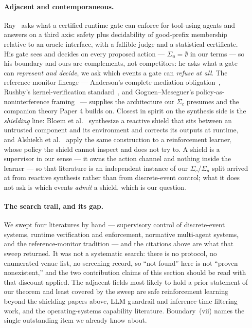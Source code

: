 \documentclass[11pt,a4paper]{article}  \usepackage{mdframed} \usepackage{graphicx} \usepackage{tabularx}
\begin{document}
\paragraph{Adjacent and contemporaneous.} Ray~\cite{ray26} asks what a certified runtime gate can enforce for tool-using
agents and answers on a third axis: safety plus decidability of good-prefix membership relative to an oracle interface, with
a fallible judge and a statistical certificate. His gate sees and decides on every proposed action --- $\Sigma_u=\emptyset$
in our terms --- so his boundary and ours are complements, not competitors: he asks what a gate can \emph{represent and
decide}, we ask which events a gate can \emph{refuse at all}. The reference-monitor lineage --- Anderson's complete-mediation
obligation~\cite{anderson}, Rushby's kernel-verification standard~\cite{rushby}, and Goguen--Meseguer's
policy-as-noninterference framing~\cite{gm82} --- supplies the architecture our $\Sigma_c$ presumes and the companion theory
Paper 4 builds on. Closest in spirit on the synthesis side is the \emph{shielding} line: Bloem et al.~\cite{bkkw15}
synthesize a reactive shield that sits between an untrusted component and its environment and corrects its outputs at
runtime, and Alshiekh et al.~\cite{alshiekh18} apply the same construction to a reinforcement learner, whose policy the
shield cannot inspect and does not try to. A shield is a supervisor in our sense --- it owns the action channel and nothing
inside the learner --- so that literature is an independent instance of our $\Sigma_c/\Sigma_u$ split arrived at from
reactive synthesis rather than from discrete-event control; what it does not ask is which events \emph{admit} a shield, which
is our question.

\paragraph{The search trail, and its gap.} We swept four literatures by hand --- supervisory control of discrete-event
systems, runtime verification and enforcement, normative multi-agent systems, and the reference-monitor tradition --- and the
citations above are what that sweep returned. It was not a systematic search: there is no protocol, no enumerated venue list,
no screening record, so ``not found'' here is not ``proven nonexistent,'' and the two contribution claims of this section
should be read with that discount applied. The adjacent fields most likely to hold a prior statement of our theorem and least
covered by the sweep are safe reinforcement learning beyond the shielding papers above, LLM guardrail and inference-time
filtering work, and the operating-systems capability literature. Boundary~(vii) names the single outstanding item we already
know about.
\end{document}
